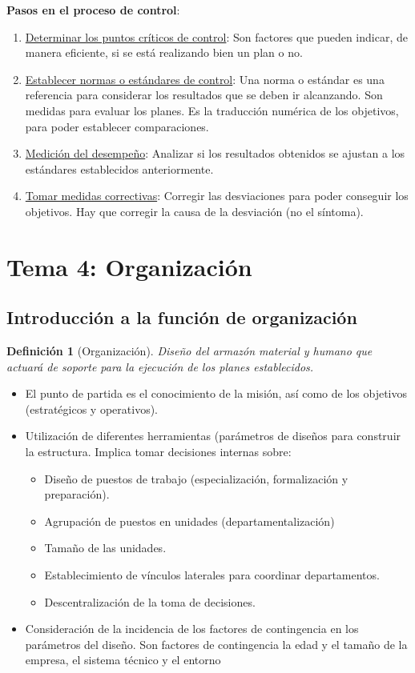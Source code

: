 \documentclass[12pt]{article}
\theoremstyle{definition_wo_parentheses}
\newtheorem{definicion}{Definición}[section]
\begin{document}
\textbf{Pasos en el proceso de control}:
\begin{enumerate}
\item \underline{Determinar los puntos críticos de control}: Son factores que pueden indicar, de manera eficiente, si se está realizando bien un plan o no.
\item \underline{Establecer normas o estándares de control}: Una norma o estándar es una referencia para considerar los resultados que se deben ir alcanzando. Son medidas para evaluar los planes. Es la traducción numérica de los objetivos, para poder establecer comparaciones.
\item \underline{Medición del desempeño}: Analizar si los resultados obtenidos  se ajustan a los estándares establecidos anteriormente.
\item \underline{Tomar medidas correctivas}: Corregir las desviaciones para poder conseguir los objetivos. Hay que corregir la causa de la desviación (no el síntoma).
\end{enumerate}


\section{Tema 4: Organización}

\subsection{Introducción a la función de organización}

\begin{definicion}[Organización] 
	Diseño del armazón material y humano que actuará de soporte para la ejecución de los planes establecidos.
\end{definicion}

\begin{itemize}
\item El punto de partida es el conocimiento de la misión, así como de los objetivos (estratégicos y operativos).

\item Utilización de diferentes herramientas (parámetros de diseños para construir la estructura. Implica tomar decisiones internas sobre: 

	\begin{itemize}
		\item Diseño de puestos de trabajo (especialización, formalización y preparación).
		\item Agrupación de puestos en unidades (departamentalización)
		\item Tamaño de las unidades.
		\item Establecimiento de vínculos laterales para coordinar departamentos.
		\item Descentralización de la toma de decisiones.
	\end{itemize}
	
\item Consideración de la incidencia de los factores de contingencia en los parámetros del diseño. Son factores de contingencia la edad y el tamaño de la empresa, el sistema técnico y el entorno
\end{itemize}
\end{document}
